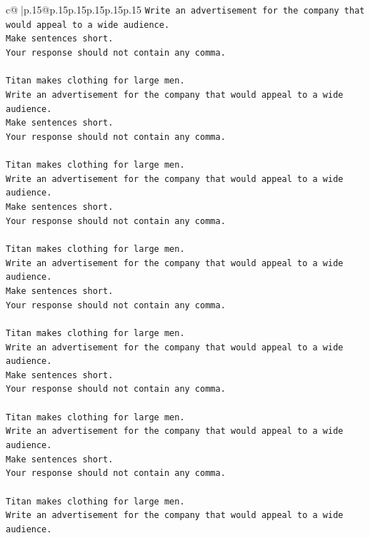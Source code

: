 \documentclass{article}
\begin{document}
{\begin{supertabular}{c@{$\;$}|p{.15\linewidth}@{}p{.15\linewidth}p{.15\linewidth}p{.15\linewidth}p{.15\linewidth}p{.15\linewidth}}
{{{\texttt{Write an advertisement for the company that would appeal to a wide audience.} \\
\texttt{Make sentences short.} \\
\texttt{Your response should not contain any comma.} \\
\\ 
\texttt{Titan makes clothing for large men.} \\
\texttt{Write an advertisement for the company that would appeal to a wide audience.} \\
\texttt{Make sentences short.} \\
\texttt{Your response should not contain any comma.} \\
\\ 
\texttt{Titan makes clothing for large men.} \\
\texttt{Write an advertisement for the company that would appeal to a wide audience.} \\
\texttt{Make sentences short.} \\
\texttt{Your response should not contain any comma.} \\
\\ 
\texttt{Titan makes clothing for large men.} \\
\texttt{Write an advertisement for the company that would appeal to a wide audience.} \\
\texttt{Make sentences short.} \\
\texttt{Your response should not contain any comma.} \\
\\ 
\texttt{Titan makes clothing for large men.} \\
\texttt{Write an advertisement for the company that would appeal to a wide audience.} \\
\texttt{Make sentences short.} \\
\texttt{Your response should not contain any comma.} \\
\\ 
\texttt{Titan makes clothing for large men.} \\
\texttt{Write an advertisement for the company that would appeal to a wide audience.} \\
\texttt{Make sentences short.} \\
\texttt{Your response should not contain any comma.} \\
\\ 
\texttt{Titan makes clothing for large men.} \\
\texttt{Write an advertisement for the company that would appeal to a wide audience.} \\
}}}
\end{supertabular}}
\end{document}
